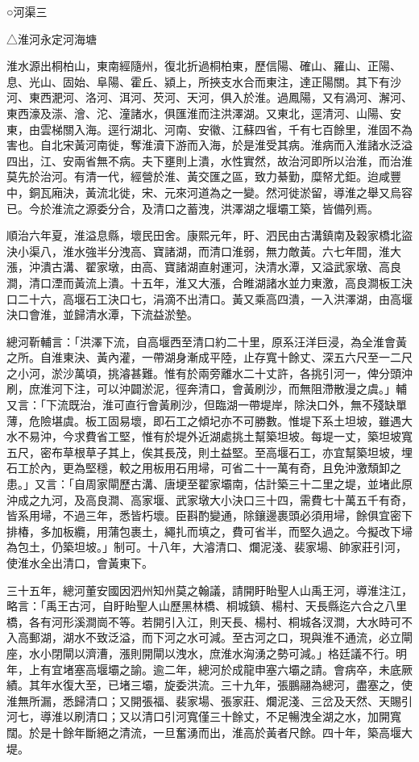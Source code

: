 
\begin{pinyinscope}
○河渠三

△淮河永定河海塘

淮水源出桐柏山，東南經隨州，復北折過桐柏東，歷信陽、確山、羅山、正陽、息、光山、固始、阜陽、霍丘、潁上，所挾支水合而東注，達正陽關。其下有沙河、東西淝河、洛河、洱河、芡河、天河，俱入於淮。過鳳陽，又有渦河、澥河、東西濠及漴、澮、沱、潼諸水，俱匯淮而注洪澤湖。又東北，逕清河、山陽、安東，由雲梯關入海。逕行湖北、河南、安徽、江蘇四省，千有七百餘里，淮固不為害也。自北宋黃河南徙，奪淮瀆下游而入海，於是淮受其病。淮病而入淮諸水泛溢四出，江、安兩省無不病。夫下壅則上潰，水性實然，故治河即所以治淮，而治淮莫先於治河。有清一代，經營於淮、黃交匯之區，致力綦勤，糜帑尤鉅。迨咸豐中，銅瓦廂決，黃流北徙，宋、元來河道為之一變。然河徙淤留，導淮之舉又烏容已。今於淮流之源委分合，及清口之蓄洩，洪澤湖之堰壩工築，皆備列焉。

順治六年夏，淮溢息縣，壞民田舍。康熙元年，盱、泗民由古溝鎮南及穀家橋北盜決小渠八，淮水強半分洩高、寶諸湖，而清口淮弱，無力敵黃。六七年間，淮大漲，沖潰古溝、翟家墩，由高、寶諸湖直射運河，決清水潭，又溢武家墩、高良澗，清口湮而黃流上潰。十五年，淮又大漲，合睢湖諸水並力東激，高良澗板工決口二十六，高堰石工決口七，涓滴不出清口。黃又乘高四潰，一入洪澤湖，由高堰決口會淮，並歸清水潭，下流益淤墊。

總河靳輔言：「洪澤下流，自高堰西至清口約二十里，原系汪洋巨浸，為全淮會黃之所。自淮東決、黃內灌，一帶湖身漸成平陸，止存寬十餘丈、深五六尺至一二尺之小河，淤沙萬頃，挑濬甚難。惟有於兩旁離水二十丈許，各挑引河一，俾分頭沖刷，庶淮河下注，可以沖闢淤泥，徑奔清口，會黃刷沙，而無阻滯散漫之虞。」輔又言：「下流既治，淮可直行會黃刷沙，但臨湖一帶堤岸，除決口外，無不殘缺單薄，危險堪虞。板工固易壞，即石工之傾圮亦不可勝數。惟堤下系土坦坡，雖遇大水不易沖，今求費省工堅，惟有於堤外近湖處挑土幫築坦坡。每堤一丈，築坦坡寬五尺，密布草根草子其上，俟其長茂，則土益堅。至高堰石工，亦宜幫築坦坡，埋石工於內，更為堅穩，較之用板用石用埽，可省二十一萬有奇，且免沖激頹卸之患。」又言：「自周家閘歷古溝、唐埂至翟家壩南，估計築三十二里之堤，並堵此原沖成之九河，及高良澗、高家堰、武家墩大小決口三十四，需費七十萬五千有奇，皆系用埽，不過三年，悉皆朽壞。臣斟酌變通，除鑲邊裹頭必須用埽，餘俱宜密下排椿，多加板纜，用蒲包裹土，繩扎而填之，費可省半，而堅久過之。今擬改下埽為包土，仍築坦坡。」制可。十八年，大濬清口、爛泥淺、裴家場、帥家莊引河，使淮水全出清口，會黃東下。

三十五年，總河董安國因泗州知州莫之翰議，請開盱眙聖人山禹王河，導淮注江，略言：「禹王古河，自盱眙聖人山歷黑林橋、桐城鎮、楊村、天長縣迄六合之八里橋，各有河形溪澗崗不等。若開引入江，則天長、楊村、桐城各汊澗，大水時可不入高郵湖，湖水不致泛溢，而下河之水可減。至古河之口，現與淮不通流，必立閘座，水小閉閘以濟漕，漲則開閘以洩水，庶淮水洶湧之勢可減。」格廷議不行。明年，上有宜堵塞高堰壩之諭。逾二年，總河於成龍申塞六壩之請。會病卒，未底厥績。其年水復大至，已堵三壩，旋委洪流。三十九年，張鵬翮為總河，盡塞之，使淮無所漏，悉歸清口；又開張福、裴家場、張家莊、爛泥淺、三岔及天然、天賜引河七，導淮以刷清口；又以清口引河寬僅三十餘丈，不足暢洩全湖之水，加開寬闊。於是十餘年斷絕之清流，一旦奮湧而出，淮高於黃者尺餘。四十年，築高堰大堤。


\end{pinyinscope}
